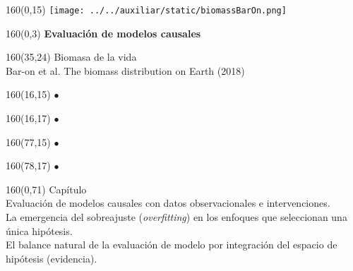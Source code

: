 \documentclass[shownotes,aspectratio=169]{beamer}
\newcounter{capitulo}
\newcommand{\unidad}{\thecapitulo \stepcounter{capitulo}}
\begin{document}
\begin{frame}
\begin{textblock}{160}(0,15) \centering
\texttt{[image: ../../auxiliar/static/biomassBarOn.png]}
\end{textblock}

\begin{textblock}{160}(0,3) \centering
\LARGE \textcolor{black!90}{\fontsize{22}{0}\selectfont \textbf{Evaluación de modelos causales}}
\end{textblock}

\begin{textblock}{160}(35,24)
\textcolor{black!95}{\small Biomasa de la vida \\
\fontsize{2}{0}\selectfont \hspace{0.05cm} Bar-on et al. The biomass distribution on Earth (2018) \\}
\end{textblock}

\begin{textblock}{160}(16,15)
\LARGE \textcolor{black!0}{\fontsize{1200}{1200}\selectfont $\bm{\bullet}$ }
\end{textblock}
\begin{textblock}{160}(16,17)
\LARGE \textcolor{black!0}{\fontsize{1200}{1200}\selectfont $\bm{\bullet}$ }
\end{textblock}

\begin{textblock}{160}(77,15)
\LARGE \textcolor{black!0}{\fontsize{1200}{1200}\selectfont $\bm{\bullet}$ }
\end{textblock}
\begin{textblock}{160}(78,17)
\LARGE \textcolor{black!0}{\fontsize{1200}{1200}\selectfont $\bm{\bullet}$ }
\end{textblock}


\begin{textblock}{160}(0,71) \centering
\textcolor{black!95}{Capítulo \unidad \\ \small
Evaluación de modelos causales con datos observacionales e intervenciones. \\
La emergencia del sobreajuste (\emph{overfitting}) en los enfoques que seleccionan una única hipótesis. \\
El balance natural de la evaluación de modelo por integración del espacio de hipótesis (evidencia). \\
}
\end{textblock}


\end{frame}
\end{document}
